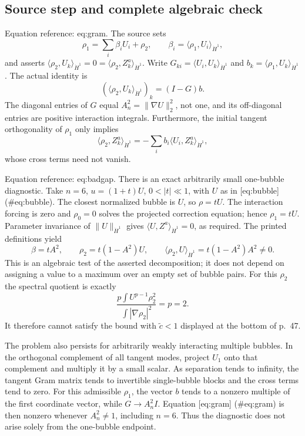 \documentclass[10pt]{article}
\begin{document}
\subsection*{Source step and complete algebraic check}
Equation reference: eq:gram. The source sets \[\rho_1=\sum_i\beta_iU_i+\rho_2,\qquad
 \beta_i=\langle \rho_1,U_i\rangle_{\dot H^1},\] and asserts \(\langle \rho_2,U_k\rangle_{\dot H^1}=0=\langle \rho_2,Z_k^a\rangle_{\dot H^1}\). Write \(G_{ki}=\langle U_i,U_k\rangle_{\dot H^1}\) and \(b_k=\langle \rho_1,U_k\rangle_{\dot H^1}\). The actual identity is \[
 (\langle \rho_2,U_k\rangle_{\dot H^1})_k=(I-G)b.\] The diagonal entries of \(G\) equal \(A_n^2=\|\nabla U\|_2^2\), not one, and its off-diagonal entries are positive interaction integrals. Furthermore, the initial tangent orthogonality of \(\rho_1\) only implies \[\langle \rho_2,Z_k^a\rangle_{\dot H^1}=-\sum_i b_i\langle U_i,Z_k^a\rangle_{\dot H^1},\] whose cross terms need not vanish.\par
Equation reference: eq:badgap. There is an exact arbitrarily small one-bubble diagnostic. Take \(n=6\), \(u=(1+t)U\), \(0<|t|\ll1\), with \(U\) as in [eq:bubble] (\#eq:bubble). The closest normalized bubble is \(U\), so \(\rho=tU\). The interaction forcing is zero and \(\rho_0=0\) solves the projected correction equation; hence \(\rho_1=tU\). Parameter invariance of \(\|U\|_{\dot H^1}\) gives \(\langle U,Z^a\rangle_{\dot H^1}=0\), as required. The printed definitions yield \[\beta=tA^2,\qquad
 \rho_2=t(1-A^2)U,\qquad
 \langle \rho_2,U\rangle_{\dot H^1}=t(1-A^2)A^2\ne0.\] This is an algebraic test of the asserted decomposition; it does not depend on assigning a value to a maximum over an empty set of bubble pairs. For this \(\rho_2\) the spectral quotient is exactly \[
 \frac{p\int U^{p-1}\rho_2^2}{\int|\nabla\rho_2|^2}=p=2.\] It therefore cannot satisfy the bound with \(\widetilde c<1\) displayed at the bottom of p. 47.\par
The problem also persists for arbitrarily weakly interacting multiple bubbles. In the orthogonal complement of all tangent modes, project \(U_1\) onto that complement and multiply it by a small scalar. As separation tends to infinity, the tangent Gram matrix tends to invertible single-bubble blocks and the cross terms tend to zero. For this admissible \(\rho_1\), the vector \(b\) tends to a nonzero multiple of the first coordinate vector, while \(G\to A_n^2I\). Equation [eq:gram] (\#eq:gram) is then nonzero whenever \(A_n^2\ne1\), including \(n=6\). Thus the diagnostic does not arise solely from the one-bubble endpoint.\par
\end{document}

